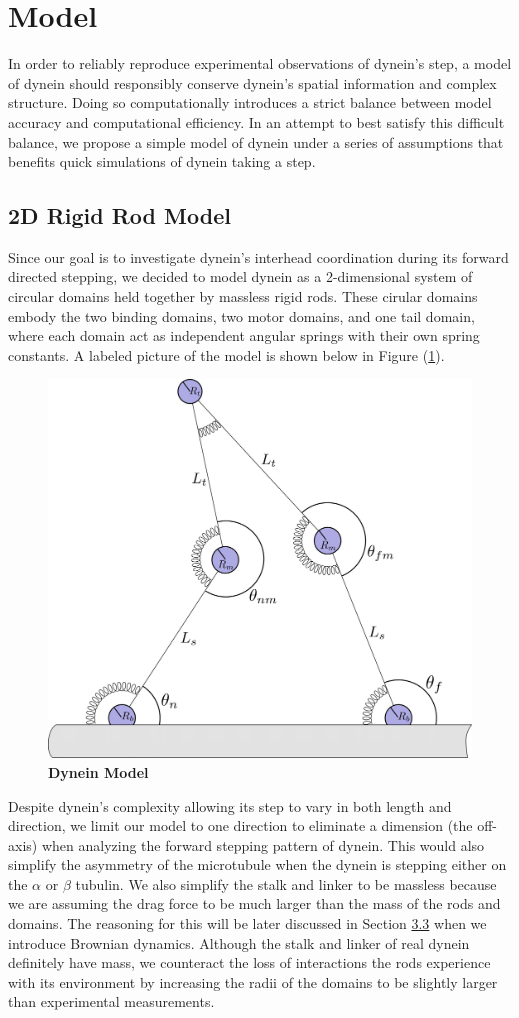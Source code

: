 \section{Model}
In order to reliably reproduce experimental observations of dynein's step, a model of dynein should responsibly conserve dynein's spatial information and complex structure. Doing so computationally introduces a strict balance between model accuracy and computational efficiency. In an attempt to best satisfy this difficult balance, we propose a simple model of dynein under a series of assumptions that benefits quick simulations of dynein taking a step. 


\subsection{2D Rigid Rod Model}
Since our goal is to investigate dynein's interhead coordination during its forward directed stepping, we decided to model dynein as a 2-dimensional system of circular domains held together by massless rigid rods. These cirular domains embody the two binding domains, two motor domains, and one tail domain, where each domain act as independent angular springs with their own spring constants. A labeled picture of the model is shown below in Figure (\ref{fig:model}). 

\begin{figure}[H]
	\centering
	\includegraphics[width=0.6\columnwidth]{Figures/model-cartoon.png}
	\caption[Dynein Model]{\textbf{Dynein Model} \cite{Capek2017}}
	\label{fig:model}
\end{figure}

Despite dynein's complexity allowing its step to vary in both length and direction, we limit our model to one direction to eliminate a dimension (the off-axis) when analyzing the forward stepping pattern of dynein. This would also simplify the asymmetry of the microtubule when the dynein is stepping either on the $\alpha$ or $\beta$ tubulin. We also simplify the stalk and linker to be massless because we are assuming the drag force to be much larger than the mass of the rods and domains. The reasoning for this will be later discussed in Section \hyperref[sec:BrownianDynamics]{3.3} when we introduce Brownian dynamics. Although the stalk and linker of real dynein definitely have mass, we counteract the loss of interactions the rods experience with its environment by increasing the radii of the domains to be slightly larger than experimental measurements.

